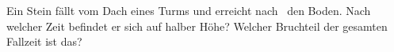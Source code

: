 Ein Stein fällt vom Dach eines Turms und erreicht nach \TgO\ den Boden. Nach welcher Zeit befindet er sich auf halber Höhe? Welcher Bruchteil der gesamten Fallzeit ist das?
